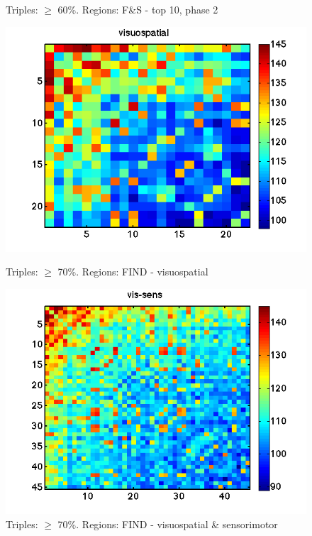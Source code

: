 \documentclass[11pt]{article}
\begin{document}
\begin{figure}[h]
\begin{minipage}{.45\textwidth}
\vskip -10pt
\caption{Triples: $\geq$ 60\%. Regions: F\&S - top 10, phase 2}
\end{minipage}
\vskip 20pt
\begin{minipage}{.45\textwidth}
\includegraphics[width=\textwidth]{pictures/correlations_FIND-visuospatial_c70.png}
\vskip -10pt
\caption{Triples: $\geq$ 70\%. Regions: FIND - visuospatial}
\end{minipage}
\hfill
\begin{minipage}{.45\textwidth}
\includegraphics[width=\textwidth]{pictures/correlations_FIND-vis-sens_c70.png}
\vskip -10pt
\caption{Triples: $\geq$ 70\%. Regions: FIND - visuospatial \& sensorimotor}
\end{minipage}
\end{figure}
\end{document}
